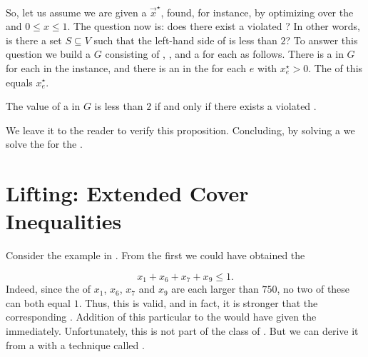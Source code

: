 \paragraph{}
So, let us assume we are given a  $\vec{x}^{\star}$, found, for instance, by optimizing  over the   and $0\leq x\leq 1$. The question now is: does there exist a violated ? In other words, is there a set $S\subseteq V$ such that the left-hand side of  is less than $2$? To answer this question we build a  $G$ consisting of , , and a  for each  as follows. There is a  in $G$ for each  in the  instance, and there is an  in the  for each $e$ with $x_e^{\star}>0$. The  of this  equals $x_e^{\star}$.

\begin{proposition}
The value of a  in $G$ is less than $2$ if and only if there exists a violated .
\end{proposition}


We leave it to the reader to verify this proposition. Concluding, by solving a  we solve the  for the .

\section{Lifting: Extended Cover Inequalities}

Consider the example in . From the first  we could have obtained the 

\begin{equation}
x_1+x_6+x_7+x_9\leq1.
\end{equation}
Indeed, since the  of $x_1$, $x_6$, $x_7$ and $x_9$ are each larger than $750$, no two of these  can both equal $1$. Thus, this  is valid, and in fact, it is stronger that the corresponding . Addition of this particular  to the  would have given the  immediately. Unfortunately, this  is not part of the class of . But we can derive it from a  with a technique called .

